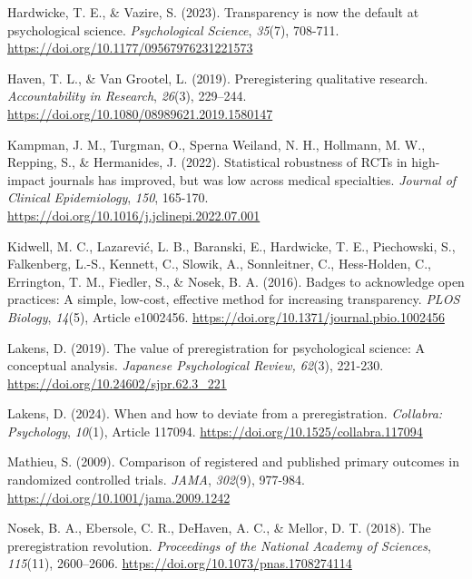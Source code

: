 \documentclass[authordate, meta]{jote-new-article}
\begin{document}
	Hardwicke, T. E., \& Vazire, S. (2023). Transparency is now the default at psychological science. \emph{Psychological Science}, \emph{35}(7), 708-711. \url{https://doi.org/10.1177/09567976231221573}



	Haven, T. L., \& Van Grootel, L. (2019). Preregistering qualitative research. \emph{Accountability in Research}, \emph{26}(3), 229--244. \url{https://doi.org/10.1080/08989621.2019.1580147}



	Kampman, J. M., Turgman, O., Sperna Weiland, N. H., Hollmann, M. W., Repping, S., \& Hermanides, J. (2022). Statistical robustness of RCTs in high-impact journals has improved, but was low across medical specialties. \emph{Journal of Clinical Epidemiology}, \emph{150}, 165-170. \url{https://doi.org/10.1016/j.jclinepi.2022.07.001}



	Kidwell, M. C., Lazarević, L. B., Baranski, E., Hardwicke, T. E., Piechowski, S., Falkenberg, L.-S., Kennett, C., Slowik, A., Sonnleitner, C., Hess-Holden, C., Errington, T. M., Fiedler, S., \& Nosek, B. A. (2016). Badges to acknowledge open practices: A simple, low-cost, effective method for increasing transparency. \emph{PLOS Biology}, \emph{14}(5), Article e1002456. \url{https://doi.org/10.1371/journal.pbio.1002456}



	Lakens, D. (2019). The value of preregistration for psychological science: A conceptual analysis. \emph{Japanese Psychological Review, 62}(3), 221-230. \url{https://doi.org/10.24602/sjpr.62.3_221}



	Lakens, D. (2024). When and how to deviate from a preregistration. \emph{Collabra: Psychology}, \emph{10}(1), Article 117094. \url{https://doi.org/10.1525/collabra.117094}



	Mathieu, S. (2009). Comparison of registered and published primary outcomes in randomized controlled trials. \emph{JAMA}, \emph{302}(9), 977-984. \url{https://doi.org/10.1001/jama.2009.1242}



	Nosek, B. A., Ebersole, C. R., DeHaven, A. C., \& Mellor, D. T. (2018). The preregistration revolution. \emph{Proceedings of the National Academy of Sciences}, \emph{115}(11), 2600--2606. \url{https://doi.org/10.1073/pnas.1708274114}
\end{document}
